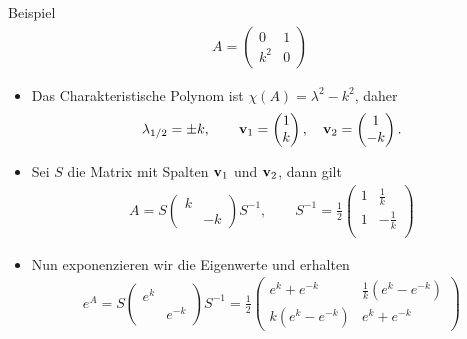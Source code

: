 \begin{frame}{Beispiel}
  \begin{gather*}
    A =
    \begin{pmatrix}
      0 & 1\\k^2 & 0
    \end{pmatrix}
  \end{gather*}
  \begin{itemize}
  \item<+-> Das Charakteristische Polynom ist $\chi(A) = \lambda^2-k^2$, daher
    \begin{gather*}
      \lambda_{1/2} = \pm k,
      \qquad \mathbf{v}_1 =
      \begin{pmatrix}
        1\\k
      \end{pmatrix},
      \quad
      \mathbf{v}_2 =
      \begin{pmatrix}
        1 \\ -k
      \end{pmatrix}.
    \end{gather*}
  \item<+->
    Sei $S$ die Matrix mit Spalten $\mathbf{v}_1$ und $\mathbf{v}_2$, dann gilt
    \begin{gather*}
      A = S
      \begin{pmatrix}
        k \\ &-k
      \end{pmatrix}
      S^{-1},
      \qquad
      S^{-1} =
      \frac12
      \begin{pmatrix}
        1 & \tfrac1k\\
        1 & -\tfrac1k\\
      \end{pmatrix}
    \end{gather*}
  \item<+-> Nun exponenzieren wir die Eigenwerte und erhalten
    \begin{gather*}
      e^A =  S
      \begin{pmatrix}
        e^k \\ &e^{-k}
      \end{pmatrix}
      S^{-1}
      = \frac12
      \begin{pmatrix}
        e^k + e^{-k} & \tfrac 1k (e^k - e^{-k}) \\
        k (e^k - e^{-k}) & e^k + e^{-k}
      \end{pmatrix}
    \end{gather*}
  \end{itemize}
\end{frame}

